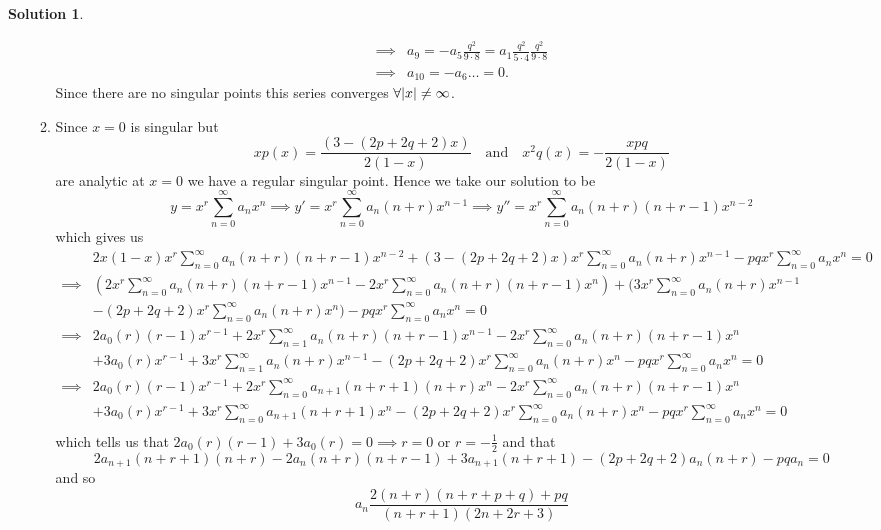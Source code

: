 \documentclass[10pt]{article}
\theoremstyle{definition}
\newtheorem{soln}{Solution}
\begin{document}
\begin{soln}
\begin{enumerate}[label=(\alph*)]
\begin{enumerate}[label=\roman*.]
\begin{align*}
                    \implies & a_{9}=-a_5\frac{q^2}{9\cdot 8}=a_1\frac{q^2}{5\cdot 4}\frac{q^2}{9\cdot 8} \\
                    \implies & a_{10}=-a_{6}\dots=0.
                  \end{align*}
                  Since there are no singular points this series converges $\forall \abs{x} \neq \infty$.
            \item Since $x=0$ is singular but
                  $$xp(x)=\frac{(3 - (2p + 2q + 2)x)}{2(1 - x)}\quad\text{and}\quad x^2q(x)=-\frac{xpq}{2(1 - x)}$$
                  are analytic at $x=0$ we have a regular singular point. Hence we take our solution to be
                  $$y=x^r\sum_{n=0}^{\infty}a_nx^n\implies y'=x^r\sum_{n=0}^{\infty}a_n(n+r)x^{n-1}\implies y''=x^r\sum_{n=0}^{\infty}a_n(n+r)(n+r-1)x^{n-2}$$
                  which gives us
                  \begin{align*}
                             & 2x(1 - x)x^r\sum_{n=0}^{\infty}a_n(n+r)(n+r-1)x^{n-2} + (3 - (2p + 2q + 2)x)x^r\sum_{n=0}^{\infty}a_n(n+r)x^{n-1} - pqx^r\sum_{n=0}^{\infty}a_nx^n = 0 \\
                    \implies & (2x^r\sum_{n=0}^{\infty}a_n(n+r)(n+r-1)x^{n-1} - 2x^r\sum_{n=0}^{\infty}a_n(n+r)(n+r-1)x^{n}) + (3x^r\sum_{n=0}^{\infty}a_n(n+r)x^{n-1}                \\
                             & - (2p + 2q + 2)x^r\sum_{n=0}^{\infty}a_n(n+r)x^{n}) - pqx^r\sum_{n=0}^{\infty}a_nx^n = 0                                                               \\
                    \implies & 2a_0(r)(r-1)x^{r-1}+2x^r\sum_{n=1}^{\infty}a_n(n+r)(n+r-1)x^{n-1} - 2x^r\sum_{n=0}^{\infty}a_n(n+r)(n+r-1)x^{n}                                        \\
                             & + 3a_0(r)x^{r-1}+3x^r\sum_{n=1}^{\infty}a_n(n+r)x^{n-1}- (2p + 2q + 2)x^r\sum_{n=0}^{\infty}a_n(n+r)x^{n} - pqx^r\sum_{n=0}^{\infty}a_nx^n = 0         \\
                    \implies & 2a_0(r)(r-1)x^{r-1}+2x^r\sum_{n=0}^{\infty}a_{n+1}(n+r+1)(n+r)x^{n} - 2x^r\sum_{n=0}^{\infty}a_n(n+r)(n+r-1)x^{n}                                      \\
                             & + 3a_0(r)x^{r-1}+3x^r\sum_{n=0}^{\infty}a_{n+1}(n+r+1)x^{n}- (2p + 2q + 2)x^r\sum_{n=0}^{\infty}a_n(n+r)x^{n} - pqx^r\sum_{n=0}^{\infty}a_nx^n = 0     \\
                  \end{align*}
                  which tells us that
                  $2a_0(r)(r-1)+ 3a_0(r)=0\implies r=0\text{ or }r=-\frac{1}{2}$
                  and that
                  $$2a_{n+1}(n+r+1)(n+r) - 2a_n(n+r)(n+r-1)+3a_{n+1}(n+r+1)- (2p + 2q + 2)a_n(n+r) - pqa_n = 0$$
                  and so
                  $$a_n\frac{2(n+r)(n+r+p+q) + pq}{(n+r+1)(2n+2r+3)}$$


\end{enumerate}
\end{enumerate}
\end{soln}
\end{document}
